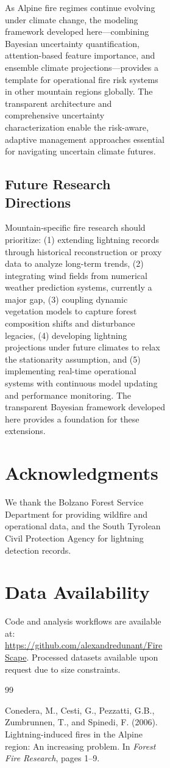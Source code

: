\documentclass[11pt,a4paper]{article}
\begin{document}
\begin{figure}[H]
\begin{figure}[H]
\begin{figure}[H]
As Alpine fire regimes continue evolving under climate change, the modeling framework developed here---combining Bayesian uncertainty quantification, attention-based feature importance, and ensemble climate projections---provides a template for operational fire risk systems in other mountain regions globally. The transparent architecture and comprehensive uncertainty characterization enable the risk-aware, adaptive management approaches essential for navigating uncertain climate futures.

\subsection{Future Research Directions}

Mountain-specific fire research should prioritize: (1) extending lightning records through historical reconstruction or proxy data to analyze long-term trends, (2) integrating wind fields from numerical weather prediction systems, currently a major gap, (3) coupling dynamic vegetation models to capture forest composition shifts and disturbance legacies, (4) developing lightning projections under future climates to relax the stationarity assumption, and (5) implementing real-time operational systems with continuous model updating and performance monitoring. The transparent Bayesian framework developed here provides a foundation for these extensions.

\section*{Acknowledgments}
We thank the Bolzano Forest Service Department for providing wildfire and operational data, and the South Tyrolean Civil Protection Agency for lightning detection records.

\section*{Data Availability}
Code and analysis workflows are available at: \url{https://github.com/alexandredunant/FireScape}. Processed datasets available upon request due to size constraints.


\begin{thebibliography}{99}

Conedera, M., Cesti, G., Pezzatti, G.B., Zumbrunnen, T., and Spinedi, F. (2006).
\newblock Lightning-induced fires in the Alpine region: An increasing problem.
\newblock In \textit{Forest Fire Research}, pages 1--9.


\end{thebibliography}
\end{figure}
\end{figure}
\end{figure}
\end{document}
